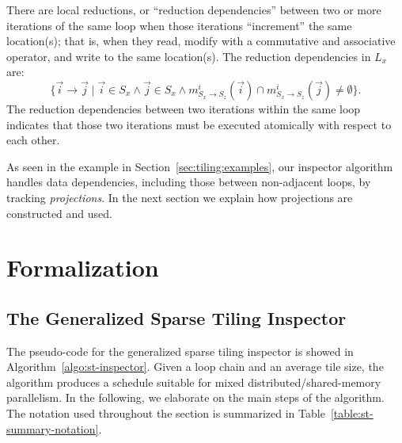 There are local reductions, or ``reduction dependencies'' between two or more iterations of the same loop when those iterations ``increment'' the same location(s); that is, when they read, modify with a commutative and associative operator, and write to the same location(s). The reduction dependencies in $L_x$ are:
\[
	\{ \vec{i} \rightarrow \vec{j} \; | \; \vec{i} \in S_x \wedge \vec{j} \in S_x \wedge m_{S_x\rightarrow S_z}^{i}(\vec{i}) \cap m_{S_x \rightarrow S_z}^{i}(\vec{j}) \ne \emptyset \}.
\]
The reduction dependencies between two iterations within the same loop indicates that those two iterations must be executed atomically with respect to each other.

As seen in the example in Section~\ref{sec:tiling:examples}, our inspector algorithm handles data dependencies, including those between non-adjacent loops, by tracking \textit{projections}. In the next section we explain how projections are constructed and used.


\clearpage


\section{Formalization}
\label{sec:tiling:algo}

\subsection{The Generalized Sparse Tiling Inspector}
\label{sec:tiling:inspector}

The pseudo-code for the generalized sparse tiling inspector is showed in Algorithm~\ref{algo:st-inspector}. Given a loop chain and an average tile size, the algorithm produces a schedule suitable for mixed distributed/shared-memory parallelism. In the following, we elaborate on the main steps of the algorithm. The notation used throughout the section is summarized in Table~\ref{table:st-summary-notation}.

